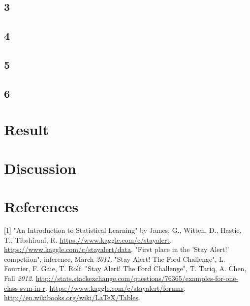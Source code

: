 \documentclass[11pt]{article}
\begin{document}
\begin{singlespacing}
\subsection{3}

\subsection{4}

\subsection{5}

\subsection{6}


\section{Result}

\section{Discussion}


\section {References}
[1]  "An Introduction to Statistical Learning" by James, G., Witten, D., Hastie, T., Tibshirani, R. \newline
[2] \url{https://www.kaggle.com/c/stayalert}. \newline
[3] \url{https://www.kaggle.com/c/stayalert/data}. \newline
[4] "First place in the 'Stay Alert!' competiion", inference, March \textit{2011}. \newline
[5] "Stay Alert! The Ford Challenge", L. Fourrier, F. Gaie, T. Rolf. \newline
[6] "Stay Alert! The Ford Challenge", T. Tariq, A. Chen, Fall \textit{2012}. \newline
[7] \url{http://stats.stackexchange.com/questions/76365/examples-for-one-class-svm-in-r}. \newline
[8] \url{https://www.kaggle.com/c/stayalert/forums}. \newline
[9] \url{http://en.wikibooks.org/wiki/LaTeX/Tables}. \newline

\end{singlespacing}
\end{document}
